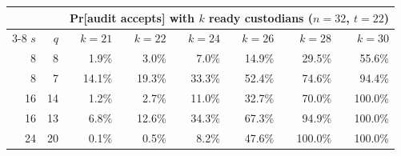 \begin{tabular}{@{}rrrrrrrr@{}}
\toprule
 & & \multicolumn{6}{c}{Pr[audit accepts] with $k$ ready custodians ($n=32$, $t=22$)}\\
\cmidrule(lr){3-8}
$s$ & $q$ & $k=21$ & $k=22$ & $k=24$ & $k=26$ & $k=28$ & $k=30$\\
\midrule
8 & 8 & 1.9\% & 3.0\% & 7.0\% & 14.9\% & 29.5\% & 55.6\%\\
8 & 7 & 14.1\% & 19.3\% & 33.3\% & 52.4\% & 74.6\% & 94.4\%\\
16 & 14 & 1.2\% & 2.7\% & 11.0\% & 32.7\% & 70.0\% & 100.0\%\\
16 & 13 & 6.8\% & 12.6\% & 34.3\% & 67.3\% & 94.9\% & 100.0\%\\
24 & 20 & 0.1\% & 0.5\% & 8.2\% & 47.6\% & 100.0\% & 100.0\%\\
\bottomrule
\end{tabular}

